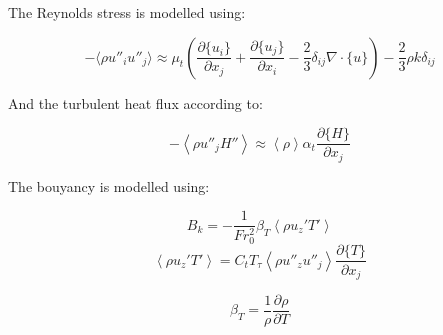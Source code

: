 \documentclass[paper=a4, fontsize=12pt]{scrartcl} %
\newcommand{\rave}[1]{\left<{#1}\right>}
\newcommand{\fave}[1]{\{{#1}\}}
\newcommand{\pd}{\partial }
\newcommand{\fpd}[2]{\frac{\partial #1}{\partial {#2}}}
\begin{document}
The Reynolds stress is modelled using:

\begin{equation}
-\langle \rho u''_i u''_j \rangle \approx \mu_t \left(\fpd{\fave{u_i}}{x_j} +\fpd{\fave{u_j}}{x_i} - \frac{2}{3}\delta_{ij} \nabla \cdot \fave{u} \right) - \frac{2}{3} \rho k \delta_{ij}
\end{equation}

And the turbulent heat flux according to:

\begin{equation}
-\rave{ \rho u''_j H''} \approx \rave{\rho} \alpha_t \fpd{\fave H}{x_j}
\end{equation}

The bouyancy is modelled using:

\begin{equation}
B_k = -\frac{1}{Fr_0^2}\beta_T  \rave{\rho u_z'T' }
\end{equation}
\begin{equation}
\rave{\rho u_z'T' } = C_t T_\tau \rave{\rho u''_z u''_j}\fpd{\fave{T}}{x_j}
\end{equation}

\begin{equation}
\beta_T = \frac{1}{\rho}\frac{\pd \rho}{\pd T}
\end{equation}
\end{document}
